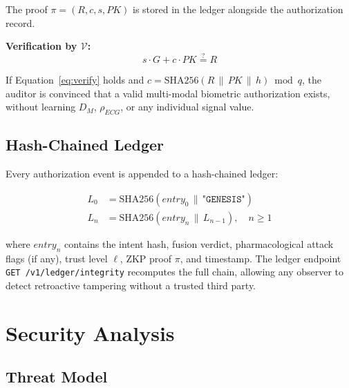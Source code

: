 \documentclass[12pt,a4paper]{article}
\begin{document}
The proof $\pi = (R, c, s, PK)$ is stored in the ledger alongside the
authorization record.

\textbf{Verification by $\mathcal{V}$:}
\begin{equation}
s \cdot G + c \cdot PK \stackrel{?}{=} R
\label{eq:verify}
\end{equation}

If Equation~\ref{eq:verify} holds and $c = \text{SHA256}(R \,\|\, PK \,\|\,
h) \bmod q$, the auditor is convinced that a valid multi-modal biometric
authorization exists, without learning $D_M$, $\rho_{ECG}$, or any
individual signal value.

\subsection{Hash-Chained Ledger}

Every authorization event is appended to a hash-chained ledger:

\begin{align}
L_0 &= \text{SHA256}(entry_0 \,\|\, \texttt{"GENESIS"}) \\
L_n &= \text{SHA256}(entry_n \,\|\, L_{n-1}), \quad n \geq 1
\end{align}

where $entry_n$ contains the intent hash, fusion verdict, pharmacological
attack flags (if any), trust level $\ell$, ZKP proof $\pi$, and timestamp.
The ledger endpoint \texttt{GET /v1/\allowbreak ledger/\allowbreak integrity}
recomputes the full chain, allowing any observer to detect retroactive
tampering without a trusted third party.

\section{Security Analysis}

\subsection{Threat Model}
\end{document}
